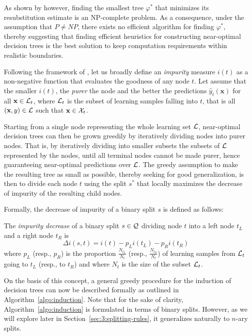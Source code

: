 As shown by \citet{hyafil:1976} however, finding the smallest tree $\varphi^*$
that minimizes its resubstitution estimate is an NP-complete problem. As a
consequence, under the assumption that $P \neq NP$, there exists no efficient
algorithm for finding $\varphi^*$, thereby suggesting that finding efficient heuristics
for constructing near-optimal decision trees is the best solution to keep computation
requirements within realistic boundaries.

Following the framework of \citet{breiman:1984}, let us broadly define an \textit{impurity} measure $i(t)$ as a
non-negative function that evaluates the goodness of any node $t$. Let assume that
the smaller $i(t)$, the \textit{purer} the node and the better the predictions
$\widehat{y}_t(\mathbf{x})$ for all $\mathbf{x} \in {\cal L}_t$, where ${\cal
L}_t$ is the subset of learning samples falling into $t$, that is all
$(\mathbf{x}, y) \in {\cal L}$ such that $\mathbf{x} \in {\cal X}_t$.

Starting from a single node representing the whole learning set  ${\cal L}$,
near-optimal decision trees can then be grown greedily by iteratively dividing
nodes into purer nodes. That is, by iteratively  dividing into smaller subsets the
subsets of ${\cal L}$ represented by the nodes, until all terminal nodes cannot
be made purer, hence guaranteeing near-optimal predictions over ${\cal L}$. The
greedy assumption to make the resulting tree as small as possible, thereby
seeking for good generalization, is then to divide each node $t$ using the
split $s^*$ that locally maximizes the decrease of impurity of the resulting child nodes.

Formally, the decrease of impurity of a binary split $s$ is defined as follows:

\begin{definition}\label{def:impurity-decrease}
The \emph{impurity decrease} of a binary split $s \in {\cal Q}$ dividing node $t$ into
a left node $t_L$ and a right node $t_R$ is
\begin{equation}
\Delta i(s, t) = i(t) - p_L i(t_L) - p_R i(t_R)
\end{equation}
where $p_L$ (resp., $p_R$) is the proportion $\tfrac{N_{t_L}}{N_t}$ (resp., $\tfrac{N_{t_R}}{N_t}$)
of learning samples from ${\cal L}_t$ going to $t_L$ (resp., to $t_R$) and where $N_t$
is the size of the subset ${\cal L}_t$.
\end{definition}

On the basis of this concept, a general greedy procedure for the induction of
decision trees can now be described formally as outlined in
Algorithm~\ref{algo:induction}. Note that for the sake of clarity,
Algorithm~\ref{algo:induction} is formulated in terms of binary splits.
However, as we will explore later in Section~\ref{sec:3:splitting-rules}, it
generalizes naturally to $n$-ary splits.

